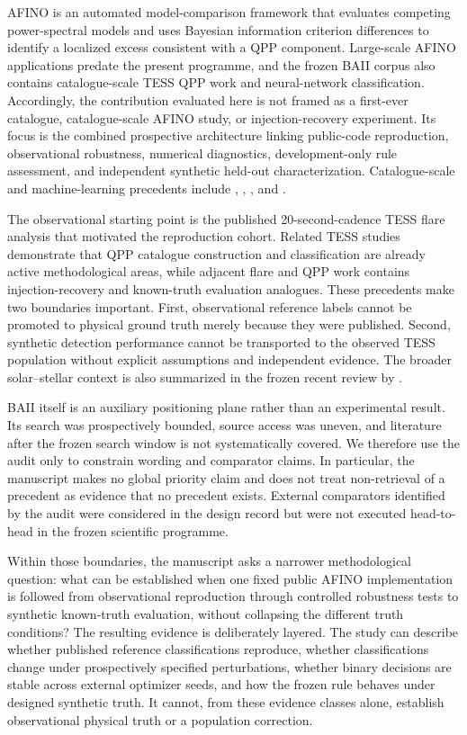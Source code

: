 \documentclass[11pt,a4paper]{article}
\begin{document}
AFINO is an automated model-comparison framework that evaluates competing power-spectral models and uses Bayesian information criterion differences to identify a localized excess consistent with a QPP component. Large-scale AFINO applications predate the present programme, and the frozen BAII corpus also contains catalogue-scale TESS QPP work and neural-network classification. Accordingly, the contribution evaluated here is not framed as a first-ever catalogue, catalogue-scale AFINO study, or injection-recovery experiment. Its focus is the combined prospective architecture linking public-code reproduction, observational robustness, numerical diagnostics, development-only rule assessment, and independent synthetic held-out characterization. Catalogue-scale and machine-learning precedents include \citet{HowardMacGregor2022}, \citet{Belov2024}, \citet{Joshi2025}, and \citet{Wang2025}.

The observational starting point is the published 20-second-cadence TESS flare analysis that motivated the reproduction cohort. Related TESS studies demonstrate that QPP catalogue construction and classification are already active methodological areas, while adjacent flare and QPP work contains injection-recovery and known-truth evaluation analogues. These precedents make two boundaries important. First, observational reference labels cannot be promoted to physical ground truth merely because they were published. Second, synthetic detection performance cannot be transported to the observed TESS population without explicit assumptions and independent evidence. The broader solar--stellar context is also summarized in the frozen recent review by \citet{Reale2026}.

BAII itself is an auxiliary positioning plane rather than an experimental result. Its search was prospectively bounded, source access was uneven, and literature after the frozen search window is not systematically covered. We therefore use the audit only to constrain wording and comparator claims. In particular, the manuscript makes no global priority claim and does not treat non-retrieval of a precedent as evidence that no precedent exists. External comparators identified by the audit were considered in the design record but were not executed head-to-head in the frozen scientific programme.

Within those boundaries, the manuscript asks a narrower methodological question: what can be established when one fixed public AFINO implementation is followed from observational reproduction through controlled robustness tests to synthetic known-truth evaluation, without collapsing the different truth conditions? The resulting evidence is deliberately layered. The study can describe whether published reference classifications reproduce, whether classifications change under prospectively specified perturbations, whether binary decisions are stable across external optimizer seeds, and how the frozen rule behaves under designed synthetic truth. It cannot, from these evidence classes alone, establish observational physical truth or a population correction.
\end{document}
